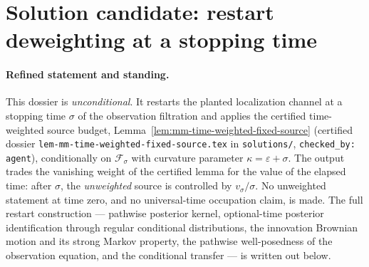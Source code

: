 \documentclass[../main.tex]{subfiles}
\begin{document}
%
\section*{Solution candidate: restart deweighting at a stopping time}
\label{sec:sol-lem-mm-restart-deweighting}

\paragraph{Refined statement and standing.}
This dossier is \emph{unconditional}.  It restarts the planted localization channel at a
stopping time $\sigma$ of the observation filtration and applies the certified
time-weighted source budget, Lemma~\ref{lem:mm-time-weighted-fixed-source}
(certified dossier \texttt{lem-mm-time-weighted-fixed-source.tex} in
\texttt{solutions/}, \texttt{checked\_by: agent}), conditionally on
$\mathcal F_\sigma$ with curvature
parameter $\kappa=\varepsilon+\sigma$.  The output trades the vanishing weight of the
certified lemma for the value of the elapsed time: after $\sigma$, the \emph{unweighted}
source is controlled by $v_\sigma/\sigma$.  No unweighted statement at time zero, and no
universal-time occupation claim, is made.  The full restart construction --- pathwise
posterior kernel, optional-time posterior identification through regular conditional
distributions, the innovation Brownian motion and its strong Markov property, the
pathwise well-posedness of the observation equation, and the conditional transfer ---
is written out below.
\end{document}
